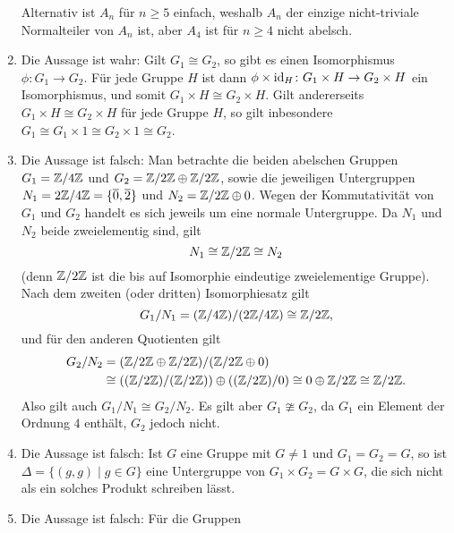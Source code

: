 \begin{solution}
\begin{enumerate}
      Alternativ ist $A_n$ für $n \geq 5$ einfach, weshalb $A_n$ der einzige nicht-triviale Normalteiler von $A_n$ ist, aber $A_4$ ist für $n \geq 4$ nicht abelsch.
    \item
      Die Aussage ist wahr:
      Gilt $G_1 \cong G_2$, so gibt es einen Isomorphismus $\phi \colon G_1 \to G_2$.
      Für jede Gruppe $H$ ist dann $\phi \times \operatorname{id}_H \colon G_1 \times H \to G_2 \times H$ ein Isomorphismus, und somit $G_1 \times H \cong G_2 \times H$.
      Gilt andererseits $G_1 \times H \cong G_2 \times H$ für jede Gruppe $H$, so gilt inbesondere $G_1 \cong G_1 \times 1 \cong G_2 \times 1 \cong G_2$.
    \item
      Die Aussage ist falsch:
      Man betrachte die beiden abelschen Gruppen $G_1 = \mathbb{Z}/4\mathbb{Z}$ und $G_2 = \mathbb{Z}/2\mathbb{Z} \oplus \mathbb{Z}/2\mathbb{Z}$, sowie die jeweiligen Untergruppen $N_1 = 2\mathbb{Z}/4\mathbb{Z} = \{\overline{0}, \overline{2}\}$ und $N_2 = \mathbb{Z}/2\mathbb{Z} \oplus 0$.
      Wegen der Kommutativität von $G_1$ und $G_2$ handelt es sich jeweils um eine normale Untergruppe.
      Da $N_1$ und $N_2$ beide zweielementig sind, gilt
      \[
        N_1 \cong \mathbb{Z}/2\mathbb{Z} \cong N_2
      \]
      (denn $\mathbb{Z}/2\mathbb{Z}$ ist die bis auf Isomorphie eindeutige zweielementige Gruppe).
      Nach dem zweiten (oder dritten) Isomorphiesatz gilt
      \[
              G_1 / N_1
        =     (\mathbb{Z}/4\mathbb{Z}) / (2\mathbb{Z}/4\mathbb{Z})
        \cong \mathbb{Z}/2\mathbb{Z},
      \]
      und für den anderen Quotienten gilt
      \begin{align*}
                G_2 / N_2
        &=      (\mathbb{Z}/2\mathbb{Z} \oplus \mathbb{Z}/2\mathbb{Z}) / (\mathbb{Z}/2\mathbb{Z} \oplus 0)
        \\
        &\cong  ((\mathbb{Z}/2\mathbb{Z})/(\mathbb{Z}/2\mathbb{Z})) \oplus ((\mathbb{Z}/2\mathbb{Z})/0)
        \cong   0 \oplus \mathbb{Z}/2\mathbb{Z}
        \cong   \mathbb{Z}/2\mathbb{Z}.
      \end{align*}
      Also gilt auch $G_1/N_1 \cong G_2/N_2$.
      Es gilt aber $G_1 \ncong G_2$, da $G_1$ ein Element der Ordnung $4$ enthält, $G_2$ jedoch nicht.
    \item
      Die Aussage ist falsch:
      Ist $G$ eine Gruppe mit $G \neq 1$ und $G_1 = G_2 = G$, so ist $\Delta = \{(g,g) \mid g \in G\}$ eine Untergruppe von $G_1 \times G_2 = G \times G$, die sich nicht als ein solches Produkt schreiben lässt.
    \item
      Die Aussage ist falsch:
      Für die Gruppen
      \begin{gather*}

\end{gather*}
\end{enumerate}
\end{solution}
